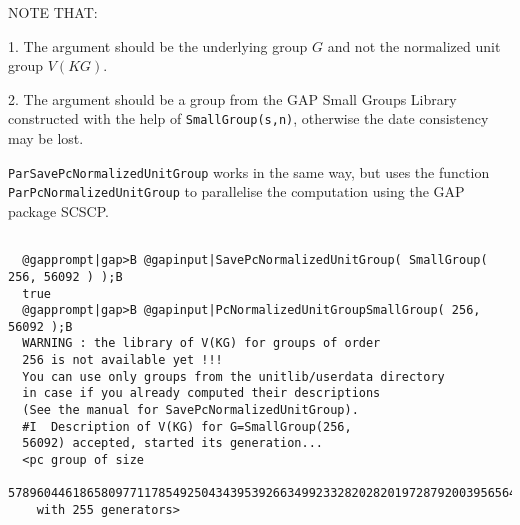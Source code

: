 \documentclass[a4paper,11pt]{report}
\begin{document}
{{{ \textsc{NOTE THAT:} 

 1. The argument should be the underlying group $G$ and not the normalized unit group $V(KG)$. 

 2. The argument should be a group from the \textsf{GAP} Small Groups Library constructed with the help of \texttt{SmallGroup(s,n)}, otherwise the date consistency may be lost. 

 \texttt{ParSavePcNormalizedUnitGroup} works in the same way, but uses the function \texttt{ParPcNormalizedUnitGroup} to parallelise the computation using the \textsf{GAP} package \textsf{SCSCP}. }

 \newpage 
\begin{Verbatim}[commandchars=@|B,fontsize=\small,frame=single,label=Example]
  
  @gapprompt|gap>B @gapinput|SavePcNormalizedUnitGroup( SmallGroup( 256, 56092 ) );B
  true
  @gapprompt|gap>B @gapinput|PcNormalizedUnitGroupSmallGroup( 256, 56092 );B
  WARNING : the library of V(KG) for groups of order 
  256 is not available yet !!! 
  You can use only groups from the unitlib/userdata directory 
  in case if you already computed their descriptions 
  (See the manual for SavePcNormalizedUnitGroup).
  #I  Description of V(KG) for G=SmallGroup(256,
  56092) accepted, started its generation...
  <pc group of size 
  57896044618658097711785492504343953926634992332820282019728792003956564819968
    with 255 generators>
  
\end{Verbatim}
 }

 }

 
\end{document}

